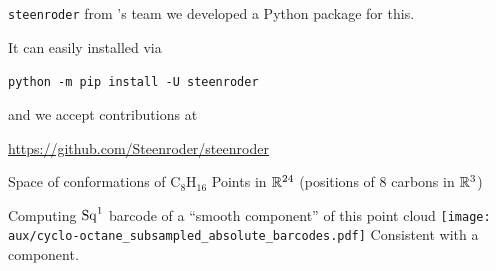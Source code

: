 \begin{frame}{\texttt{steenroder}}
	from 's team we developed a Python package for this.

	\pause\smallskip
	It can easily installed via
	\begin{center}
		\texttt{python -m pip install -U steenroder}
	\end{center}

	and we accept contributions at
	\begin{center}
		\url{https://github.com/Steenroder/steenroder}
	\end{center}
\end{frame}

\begin{frame}{Space of conformations of $\mathrm{C_8H_{16}}$}
	\pause
	Points in $\mathbb{R}^{24}$ (positions of $8$ carbons in $\mathbb{R}^3$)

	\pause\smallskip
	Computing $\operatorname{Sq}^1$ barcode of a ``smooth component'' of this point cloud
	\smallskip
	\texttt{[image: aux/cyclo-octane\_subsampled\_absolute\_barcodes.pdf]}
	Consistent with a  component.
\end{frame}

%
